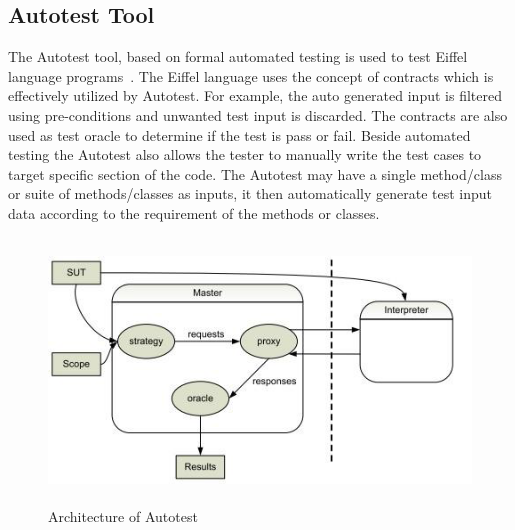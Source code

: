 \subsection{Autotest Tool}
The Autotest tool, based on formal automated testing is used to test Eiffel language programs~\cite{Ciupa2007}. The Eiffel language uses the concept of contracts which is effectively utilized by Autotest. For example, the auto generated input is filtered using pre-conditions and unwanted test input is discarded. The contracts are also used as test oracle to determine if the test is pass or fail. Beside automated testing the Autotest also allows the tester to manually write the test cases to target specific section of the code. The Autotest may have a single method/class or suite of methods/classes as inputs, it then automatically generate test input data according to the requirement of the methods or classes.

\begin{figure}[h]
	\centering
	\includegraphics[width=13cm, height=7cm]{chapter3/autotest.png}
	\caption{Architecture of Autotest~\cite{Leitner2007}}
	\label{fig:autotest}
\end{figure}

